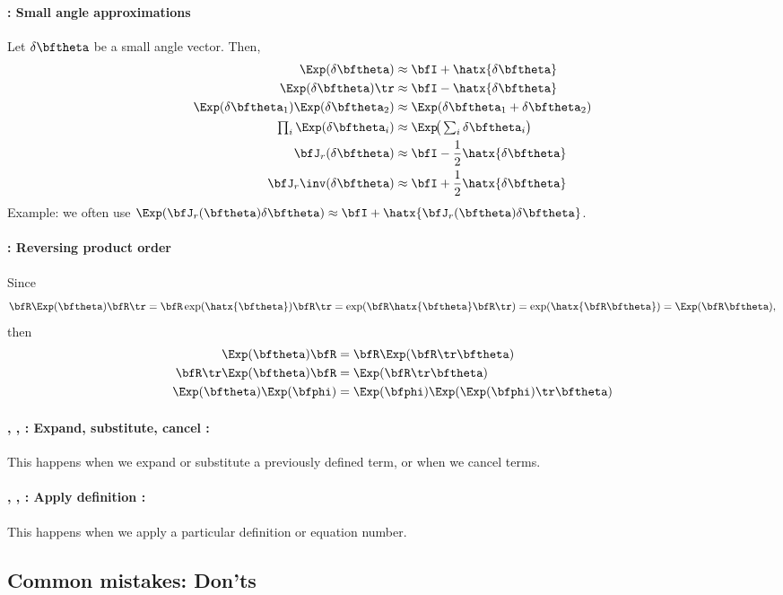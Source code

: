 \paragraph{\csmall : Small angle approximations}

Let $\dth$ be a small angle vector. Then,
%
\begin{align}
\Exp(\dth) &\approx \bfI + \hatx{\dth} \\
\Exp(\dth)\tr &\approx \bfI - \hatx{\dth} \\
\Exp(\dth_1)\Exp(\dth_2) &\approx \Exp(\dth_1+\dth_2) \\
\textstyle\prod_i \Exp(\dth_i) &\approx \Exp\!\big(\textstyle\sum_i\dth_i\big) \\
\bfJ_r(\dth) &\approx \bfI - \frac12\hatx{\dth} \\
\bfJ_r\inv(\dth) &\approx \bfI + \frac12\hatx{\dth} 
\end{align}
%
Example: we often use $\Exp(\bfJ_r(\bth)\dth)\approx \bfI + \hatx{\bfJ_r(\bth)\dth}$.

\paragraph{\cswap : Reversing product order}

Since $$\bfR\Exp(\bth)\bfR\tr=\bfR\exp(\hatx{\bth})\bfR\tr=\exp(\bfR\hatx{\bth}\bfR\tr)=\exp(\hatx{\bfR\bth})=\Exp(\bfR\bth),$$ then
%
\begin{align}
\Exp(\bth)\bfR &= \bfR\Exp(\bfR\tr\bth) \\
\bfR\tr\Exp(\bth)\bfR &= \Exp(\bfR\tr\bth) \\
\Exp(\bth)\Exp(\bphi) &= \Exp(\bphi)\Exp(\Exp(\bphi)\tr\bth) 
\end{align}


\paragraph{\cexpand, \csubst, \ccancel : Expand, substitute, cancel :} This happens when we expand or substitute a previously defined term, or when we cancel terms.

\paragraph{\tcom{$\oplus$}, \tcom{$\ominus$},  : Apply definition :} This happens when we apply a particular definition or equation number.

\subsection{Common mistakes: Don'ts}

